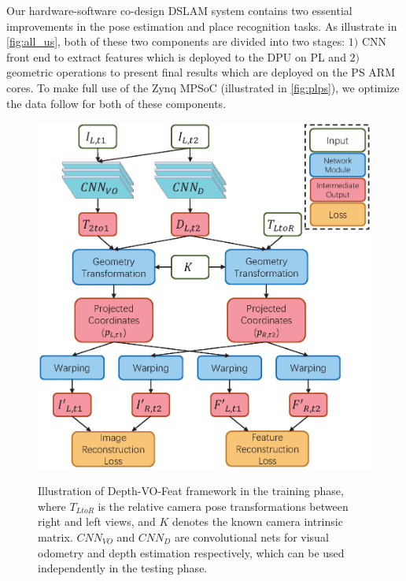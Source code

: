 \label{sec:hardsoft}
Our hardware-software co-design DSLAM system contains two essential improvements in the pose estimation and place recognition tasks. As illustrate in \cref{fig:all_us}, both of these two components are divided into two stages: $1)$ CNN front end to extract features which is deployed to the DPU on PL and $2)$ geometric operations to present final results which are deployed on the PS ARM cores. To make full use of the Zynq MPSoC (illustrated in \cref{fig:plps}), we optimize the data follow for both of these components.

\begin{figure}[t]  
    \centering  
    {\includegraphics[width=0.85\linewidth]{fig/depth_vo_feat.eps}\label{fig:dvo}}
    \caption{Illustration of Depth-VO-Feat framework in the training phase, where $T_{LtoR}$ is the relative camera pose transformations between right and left views, and $K$ denotes the known camera intrinsic matrix. $CNN_{VO}$ and $CNN_D$ are convolutional nets for visual odometry and depth estimation respectively, which can be used independently in the testing phase. }
\end{figure}

